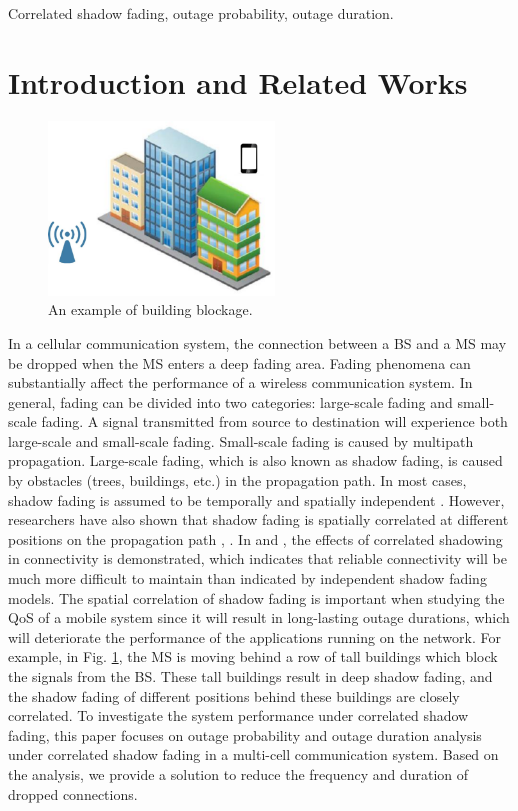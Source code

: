 \documentclass[journal,10pt]{IEEEtran}
\begin{document}
\begin{IEEEkeywords}
Correlated shadow fading, outage probability, outage duration.
\end{IEEEkeywords}

\section{Introduction and Related Works}
\begin{figure}
\centering
\includegraphics[width=6cm]{building.eps}
\caption{An example of building blockage.}
\label{building}
\end{figure}
\par In a cellular communication system, the connection between a BS and a MS may be dropped when the MS enters a deep fading area. Fading phenomena can substantially affect the performance of a wireless communication system. In general, fading can be divided into two categories: large-scale fading and small-scale fading. A signal transmitted from source to destination will experience both large-scale and small-scale fading. Small-scale fading is caused by multipath propagation. Large-scale fading, which is also known as shadow fading, is caused by obstacles (trees, buildings, etc.) in the propagation path. In most cases, shadow fading is assumed to be temporally and spatially independent \cite{rappaport1996wireless}.  However, researchers have also shown that shadow fading is spatially correlated at different positions on the propagation path \cite{gudmundson1991correlation}, \cite{zhang2008novel}. In \cite{fabbri2009impact} and \cite{patwari2008effects}, the effects of correlated shadowing in connectivity is demonstrated, which indicates that reliable connectivity will be much more difficult to maintain than indicated by independent shadow fading models. The spatial correlation of shadow fading is important when studying the QoS of a mobile system since it will result in long-lasting outage durations, which will deteriorate the performance of the applications running on the network. For example, in Fig. \ref{building}, the MS is moving behind a row of tall buildings which block the signals from the BS. These tall buildings result in deep shadow fading, and the shadow fading of different positions behind these buildings are closely correlated. To investigate the system performance under correlated shadow fading, this paper focuses on outage probability and outage duration analysis under correlated shadow fading in a multi-cell communication system. Based on the analysis, we provide a solution to reduce the frequency and duration of dropped connections.
\end{document}
